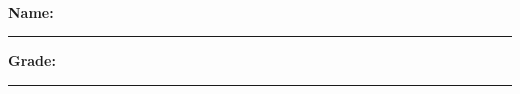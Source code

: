 \makeatletter
{}
\makeatother



\usepackage{tikz}
\pagestyle{empty}


\graphicspath{{./}{../}{../../}{../../../}{../../../../}{preamble/}{../preamble/}{../../preamble/}{../../../preamble/}}

\newcommand{\NumberAnswerBox}{%
	\tikz[baseline=-0.5ex]{\draw (0,0) rectangle (1.5cm,0.7cm);}%
}

\newcommand{\ShortNumberAnswerBox}{%
	\tikz[baseline=-0.5ex]{\draw (0,0) rectangle (1.2cm,0.7cm);}%
}


	
	
	\\
	
	\vspace{-11mm}
	\noindent
	\textbf{Name:} \rule{11cm}{0.4pt}
	\hspace{1cm}
	\textbf{Grade:} \rule{3cm}{0.4pt}

